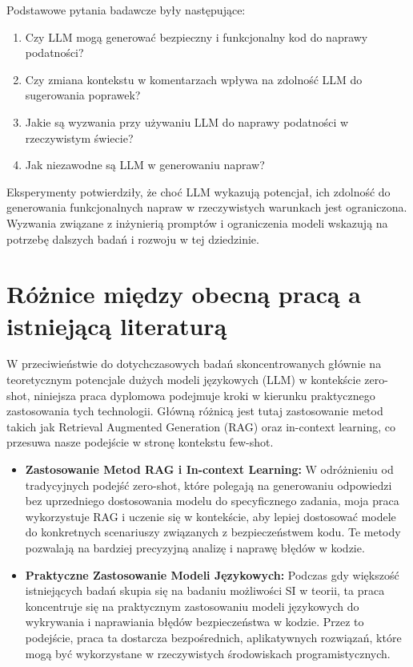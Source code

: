 Podstawowe pytania badawcze były następujące:
\begin{enumerate}
    \item Czy LLM mogą generować bezpieczny i funkcjonalny kod do naprawy podatności?
    \item Czy zmiana kontekstu w komentarzach wpływa na zdolność LLM do sugerowania poprawek?
    \item Jakie są wyzwania przy używaniu LLM do naprawy podatności w rzeczywistym świecie?
    \item Jak niezawodne są LLM w generowaniu napraw?
\end{enumerate}

Eksperymenty potwierdziły, że choć LLM wykazują potencjał, ich zdolność do generowania funkcjonalnych napraw w rzeczywistych warunkach jest ograniczona. Wyzwania związane z inżynierią promptów i ograniczenia modeli wskazują na potrzebę dalszych badań i rozwoju w tej dziedzinie.

\section{Różnice między obecną pracą a istniejącą literaturą}

W przeciwieństwie do dotychczasowych badań skoncentrowanych głównie na teoretycznym potencjale dużych modeli językowych (LLM) w kontekście zero-shot, niniejsza praca dyplomowa podejmuje kroki w kierunku praktycznego zastosowania tych technologii. Główną różnicą jest tutaj zastosowanie metod takich jak Retrieval Augmented Generation (RAG) oraz in-context learning, co przesuwa nasze podejście w stronę kontekstu few-shot. 

\begin{itemize}
    \item \textbf{Zastosowanie Metod RAG i In-context Learning:} W odróżnieniu od tradycyjnych podejść zero-shot, które polegają na generowaniu odpowiedzi bez uprzedniego dostosowania modelu do specyficznego zadania, moja praca wykorzystuje RAG i uczenie się w kontekście, aby lepiej dostosować modele do konkretnych scenariuszy związanych z bezpieczeństwem kodu. Te metody pozwalają na bardziej precyzyjną analizę i naprawę błędów w kodzie.
    
    \item \textbf{Praktyczne Zastosowanie Modeli Językowych:} Podczas gdy większość istniejących badań skupia się na badaniu możliwości SI w teorii, ta praca koncentruje się na praktycznym zastosowaniu modeli językowych do wykrywania i naprawiania błędów bezpieczeństwa w kodzie. Przez to podejście, praca ta dostarcza bezpośrednich, aplikatywnych rozwiązań, które mogą być wykorzystane w rzeczywistych środowiskach programistycznych.
\end{itemize}


